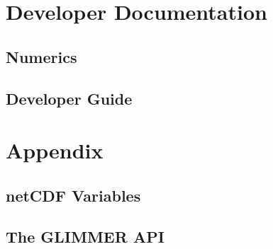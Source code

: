 \part{Developer Documentation}

\chapter{Numerics}
\renewcommand{\dir}{num}


\chapter{Developer Guide}
\renewcommand{\dir}{dg}


\renewcommand{\dir}{ext}


\part{Appendix}
\appendix
\renewcommand{\dir}{ug}
\chapter{netCDF Variables}

\chapter{The GLIMMER API}



\renewcommand{\dir}{ext}




